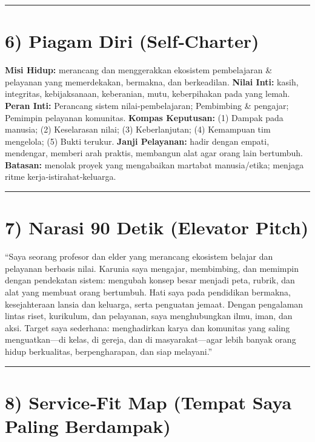 \documentclass[
  letterpaper,
  DIV=11,
  numbers=noendperiod]{scrreprt}
\begin{document}
\begin{center}\rule{0.5\linewidth}{0.5pt}\end{center}

\section{6) Piagam Diri (Self‑Charter)}\label{piagam-diri-selfcharter}

\textbf{Misi Hidup:} merancang dan menggerakkan ekosistem pembelajaran
\& pelayanan yang memerdekakan, bermakna, dan berkeadilan. \textbf{Nilai
Inti:} kasih, integritas, kebijaksanaan, keberanian, mutu, keberpihakan
pada yang lemah. \textbf{Peran Inti:} Perancang sistem
nilai‑pembelajaran; Pembimbing \& pengajar; Pemimpin pelayanan
komunitas. \textbf{Kompas Keputusan:} (1) Dampak pada manusia; (2)
Keselarasan nilai; (3) Keberlanjutan; (4) Kemampuan tim mengelola; (5)
Bukti terukur. \textbf{Janji Pelayanan:} hadir dengan empati, mendengar,
memberi arah praktis, membangun alat agar orang lain bertumbuh.
\textbf{Batasan:} menolak proyek yang mengabaikan martabat
manusia/etika; menjaga ritme kerja‑istirahat‑keluarga.

\begin{center}\rule{0.5\linewidth}{0.5pt}\end{center}

\section{7) Narasi 90 Detik (Elevator
Pitch)}\label{narasi-90-detik-elevator-pitch}

``Saya seorang profesor dan elder yang merancang ekosistem belajar dan
pelayanan berbasis nilai. Karunia saya mengajar, membimbing, dan
memimpin dengan pendekatan sistem: mengubah konsep besar menjadi peta,
rubrik, dan alat yang membuat orang bertumbuh. Hati saya pada pendidikan
bermakna, kesejahteraan lansia dan keluarga, serta penguatan jemaat.
Dengan pengalaman lintas riset, kurikulum, dan pelayanan, saya
menghubungkan ilmu, iman, dan aksi. Target saya sederhana: menghadirkan
karya dan komunitas yang saling menguatkan---di kelas, di gereja, dan di
masyarakat---agar lebih banyak orang hidup berkualitas, berpengharapan,
dan siap melayani.''

\begin{center}\rule{0.5\linewidth}{0.5pt}\end{center}

\section{8) Service‑Fit Map (Tempat Saya Paling
Berdampak)}\label{servicefit-map-tempat-saya-paling-berdampak}
\end{document}
